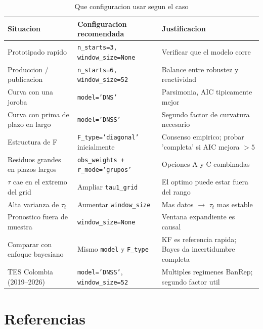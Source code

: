 \documentclass[12pt, a4paper]{article}
\theoremstyle{plain}
\theoremstyle{definition}
\theoremstyle{remark}
\begin{document}
\begin{table}[H]
\centering
\caption{Que configuracion usar segun el caso}
\label{tab:guia}
\small
\begin{tabular}{L{4cm} L{5.5cm} L{4.5cm}}
\toprule
\textbf{Situacion}
  & \textbf{Configuracion recomendada}
  & \textbf{Justificacion} \\
\midrule
Prototipado rapido
  & \texttt{n\_starts=3, window\_size=None}
  & Verificar que el modelo corre \\
\addlinespace
Produccion / publicacion
  & \texttt{n\_starts=6, window\_size=52}
  & Balance entre robustez y reactividad \\
\addlinespace
Curva con una joroba
  & \texttt{model='DNS'}
  & Parsimonia, AIC tipicamente mejor \\
\addlinespace
Curva con prima de plazo en largo
  & \texttt{model='DNSS'}
  & Segundo factor de curvatura necesario \\
\addlinespace
Estructura de F
  & \texttt{F\_type='diagonal'} inicialmente
  & Consenso empirico; probar 'completa' si AIC mejora $>5$ \\
\addlinespace
Residuos grandes en plazos largos
  & \texttt{obs\_weights + r\_mode='grupos'}
  & Opciones A y C combinadas \\
\addlinespace
$\tau$ cae en el extremo del grid
  & Ampliar \texttt{tau1\_grid}
  & El optimo puede estar fuera del rango \\
\addlinespace
Alta varianza de $\tau_t$
  & Aumentar \texttt{window\_size}
  & Mas datos $\to$ $\tau_t$ mas estable \\
\addlinespace
Pronostico fuera de muestra
  & \texttt{window\_size=None}
  & Ventana expandiente es causal \\
\addlinespace
Comparar con enfoque bayesiano
  & Mismo \texttt{model} y \texttt{F\_type}
  & KF es referencia rapida; Bayes da incertidumbre completa \\
\addlinespace
TES Colombia (2019--2026)
  & \texttt{model='DNSS'}, \texttt{window\_size=52}
  & Multiples regimenes BanRep; segundo factor util \\
\bottomrule
\end{tabular}
\end{table}

\section*{Referencias}
\end{document}

